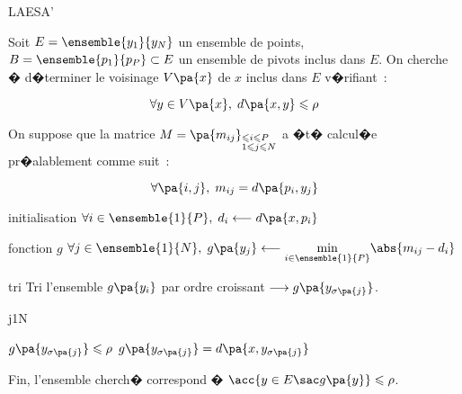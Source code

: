            \begin{xalgorithm}{LAESA'}
            \label{space_metric_algo_laesa_prime}
            
            Soit $E = \ensemble{y_1}{y_N}$ un ensemble de points, $B = \ensemble{p_1}{p_P} \subset E$ 
            un ensemble de pivots inclus dans $E$. On cherche � d�terminer le voisinage $V\pa{x}$ de $x$ 
            inclus dans $E$ v�rifiant~:
            
                        $$
                        \forall y \in V\pa{x}, \; d\pa{x,y} \leqslant \rho
                        $$
                        
            On suppose que la matrice $M = \pa{m_{ij}}_ { \begin{subarray} 1 \leqslant i \leqslant P \\ 
            1 \leqslant j \leqslant N \end{subarray} }$ a �t� calcul�e pr�alablement comme suit~:
            
                        $$
                        \forall \pa{i,j}, \; m_{ij} = d\pa{p_i, y_j}
                        $$
                        
            \begin{xalgostep}{initialisation}
                $\forall i \in \ensemble{1}{P}, \; d_i \longleftarrow d\pa{x,p_i}$
            \end{xalgostep}        
            
            \begin{xalgostep}{fonction $g$} \label{classif_laesa_prime_step_b}
                $\forall j \in \ensemble{1}{N}, \;  g\pa{y_j} \longleftarrow \underset{  i \in \ensemble{1}{P} }{\min}  \abs{ m_{ij} - d_i} $
            \end{xalgostep}
            
            \begin{xalgostep}{tri}
                Tri l'ensemble $g\pa{y_i}$ par ordre croissant $\longrightarrow g\pa{y_{\sigma\pa{j}}}$. \\
                \begin{xfor}{j}{1}{N}
                   \begin{xif}{$g\pa{y_{\sigma\pa{j}}} \leqslant \rho$}
                   $g\pa{y_{\sigma\pa{j}}} = d\pa{x,y_{\sigma\pa{j}}}$
                   \end{xif}
                \end{xfor} 
                
                Fin, l'ensemble cherch� correspond � $\acc{y \in E \sac g\pa{y}} \leqslant \rho$.
            \end{xalgostep}

\end{xalgorithm}


